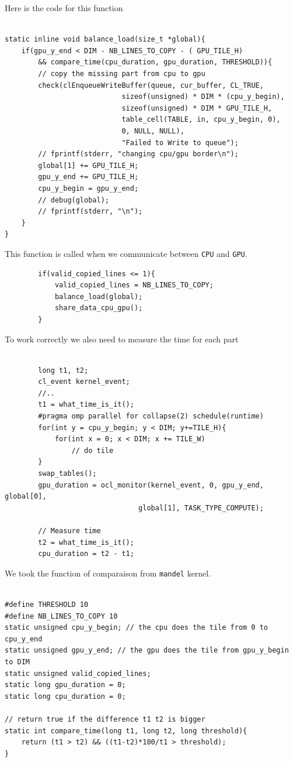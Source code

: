 \documentclass{report}
\def\CPU{\texttt{CPU}}
\def\GPU{\texttt{GPU}}
\newcommand{\code}[1]{\texttt{#1}}
\begin{document}
Here is the code for this function
\begin{verbatim}

static inline void balance_load(size_t *global){
    if(gpu_y_end < DIM - NB_LINES_TO_COPY - ( GPU_TILE_H) 
        && compare_time(cpu_duration, gpu_duration, THRESHOLD)){
        // copy the missing part from cpu to gpu
        check(clEnqueueWriteBuffer(queue, cur_buffer, CL_TRUE, 
                            sizeof(unsigned) * DIM * (cpu_y_begin),
                            sizeof(unsigned) * DIM * GPU_TILE_H, 
                            table_cell(TABLE, in, cpu_y_begin, 0), 
                            0, NULL, NULL),
                            "Failed to Write to queue");
        // fprintf(stderr, "changing cpu/gpu border\n");
        global[1] += GPU_TILE_H;
        gpu_y_end += GPU_TILE_H;
        cpu_y_begin = gpu_y_end;
        // debug(global);
        // fprintf(stderr, "\n");
    }
}
\end{verbatim}

This function is called when we communicate between \CPU{} and \GPU{}.

\begin{verbatim}
        if(valid_copied_lines <= 1){
            valid_copied_lines = NB_LINES_TO_COPY;
            balance_load(global);
            share_data_cpu_gpu();
        }
\end{verbatim}

To work correctly we also need to measure the time for each part

\begin{verbatim}

        long t1, t2;
        cl_event kernel_event;
        //..
        t1 = what_time_is_it();
        #pragma omp parallel for collapse(2) schedule(runtime)
        for(int y = cpu_y_begin; y < DIM; y+=TILE_H){
            for(int x = 0; x < DIM; x += TILE_W)
                // do tile
        }
        swap_tables();
        gpu_duration = ocl_monitor(kernel_event, 0, gpu_y_end, global[0],
                                global[1], TASK_TYPE_COMPUTE);

        // Measure time
        t2 = what_time_is_it();
        cpu_duration = t2 - t1;
\end{verbatim}

We took the function of comparaison from \code{mandel} kernel.
\begin{verbatim}

#define THRESHOLD 10
#define NB_LINES_TO_COPY 10
static unsigned cpu_y_begin; // the cpu does the tile from 0 to cpu_y_end
static unsigned gpu_y_end; // the gpu does the tile from gpu_y_begin to DIM
static unsigned valid_copied_lines;
static long gpu_duration = 0;
static long cpu_duration = 0;

// return true if the difference t1 t2 is bigger 
static int compare_time(long t1, long t2, long threshold){
    return (t1 > t2) && ((t1-t2)*100/t1 > threshold);
}
\end{verbatim}
\end{document}
